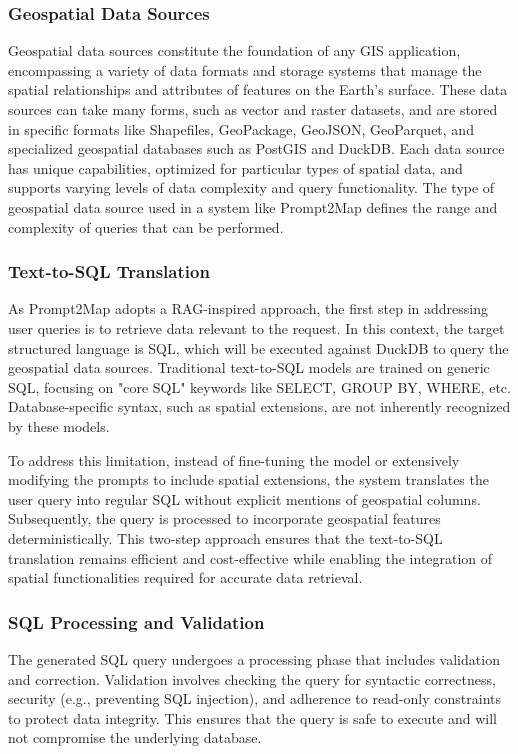 \subsubsection{Geospatial Data Sources}

Geospatial data sources constitute the foundation of any GIS application, encompassing a variety of data formats and storage systems that manage the spatial relationships and attributes of features on the Earth's surface. These data sources can take many forms, such as vector and raster datasets, and are stored in specific formats like Shapefiles, GeoPackage, GeoJSON, GeoParquet, and specialized geospatial databases such as PostGIS and DuckDB. Each data source has unique capabilities, optimized for particular types of spatial data, and supports varying levels of data complexity and query functionality. The type of geospatial data source used in a system like Prompt2Map defines the range and complexity of queries that can be performed.

\subsubsection{Text-to-SQL Translation}

As Prompt2Map adopts a RAG-inspired approach, the first step in addressing user queries is to retrieve data relevant to the request. In this context, the target structured language is SQL, which will be executed against DuckDB to query the geospatial data sources. Traditional text-to-SQL models are trained on generic SQL, focusing on "core SQL" keywords like SELECT, GROUP BY, WHERE, etc. Database-specific syntax, such as spatial extensions, are not inherently recognized by these models.

To address this limitation, instead of fine-tuning the model or extensively modifying the prompts to include spatial extensions, the system translates the user query into regular SQL without explicit mentions of geospatial columns. Subsequently, the query is processed to incorporate geospatial features deterministically. This two-step approach ensures that the text-to-SQL translation remains efficient and cost-effective while enabling the integration of spatial functionalities required for accurate data retrieval.

\subsubsection{SQL Processing and Validation}
The generated SQL query undergoes a processing phase that includes validation and correction. Validation involves checking the query for syntactic correctness, security (e.g., preventing SQL injection), and adherence to read-only constraints to protect data integrity. This ensures that the query is safe to execute and will not compromise the underlying database.

